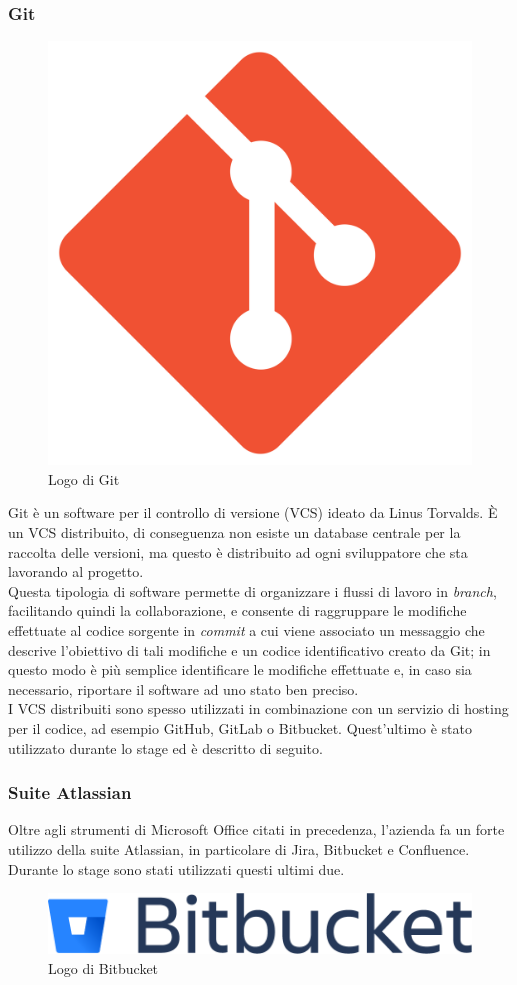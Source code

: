 \subsubsection{Git}

\begin{figure}[H]
    \centering 
    \includegraphics[width=0.2\columnwidth]{images/loghi/Git.png} 
    \caption{Logo di Git}
\end{figure}

Git è un software per il controllo di versione (VCS) ideato da Linus Torvalds. È un VCS distribuito, di conseguenza non esiste un database centrale per la raccolta delle versioni, ma questo è distribuito ad ogni sviluppatore che sta lavorando al progetto.\\
Questa tipologia di software permette di organizzare i flussi di lavoro in \emph{branch}, facilitando quindi la collaborazione, e consente di raggruppare le modifiche effettuate al codice sorgente in \emph{commit} a cui viene associato un messaggio che descrive l'obiettivo di tali modifiche e un codice identificativo creato da Git; in questo modo è più semplice identificare le modifiche effettuate e, in caso sia necessario, riportare il software ad uno stato ben preciso.\\
I VCS distribuiti sono spesso utilizzati in combinazione con un servizio di hosting per il codice, ad esempio GitHub, GitLab o Bitbucket. Quest'ultimo è stato utilizzato durante lo stage ed è descritto di seguito.


\subsubsection{Suite Atlassian}

Oltre agli strumenti di Microsoft Office citati in precedenza, l'azienda fa un forte utilizzo della suite Atlassian, in particolare di Jira, Bitbucket e Confluence. Durante lo stage sono stati utilizzati questi ultimi due.

\vspace{6mm}

\begin{figure}[H]
    \centering 
    \includegraphics[width=0.5\columnwidth]{images/loghi/bitbucket.png} 
    \caption{Logo di Bitbucket}
\end{figure}

